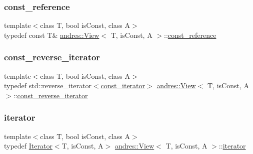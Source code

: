 \subsubsection{\texorpdfstring{const\+\_\+reference}{const\_reference}}
{\footnotesize\ttfamily template$<$class T, bool is\+Const, class A$>$ \\
typedef const T\& \hyperlink{classandres_1_1View}{andres\+::\+View}$<$ T, is\+Const, A $>$\+::\hyperlink{classandres_1_1View_a69e3d49e3d8242a33c03d42dd5ecc5b8}{const\+\_\+reference}}

\mbox{\label{classandres_1_1View_a61656971b73a48c8bf009e3200aad900}} 
\subsubsection{\texorpdfstring{const\+\_\+reverse\+\_\+iterator}{const\_reverse\_iterator}}
{\footnotesize\ttfamily template$<$class T, bool is\+Const, class A$>$ \\
typedef std\+::reverse\+\_\+iterator$<$\hyperlink{classandres_1_1View_a7b6f125a7b3830f30cd34887b61858a7}{const\+\_\+iterator}$>$ \hyperlink{classandres_1_1View}{andres\+::\+View}$<$ T, is\+Const, A $>$\+::\hyperlink{classandres_1_1View_a61656971b73a48c8bf009e3200aad900}{const\+\_\+reverse\+\_\+iterator}}

\mbox{\label{classandres_1_1View_aef54ee0a58e755b897398493d05a44df}} 
\subsubsection{\texorpdfstring{iterator}{iterator}}
{\footnotesize\ttfamily template$<$class T, bool is\+Const, class A$>$ \\
typedef \hyperlink{classandres_1_1Iterator}{Iterator}$<$T, is\+Const, A$>$ \hyperlink{classandres_1_1View}{andres\+::\+View}$<$ T, is\+Const, A $>$\+::\hyperlink{classandres_1_1View_aef54ee0a58e755b897398493d05a44df}{iterator}}

\mbox{\label{classandres_1_1View_a9a201594c82be89fccd0fe644ea2f09c}} 
